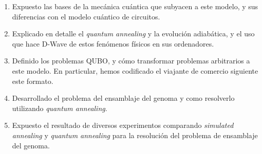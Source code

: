 \documentclass[11pt]{article}
\begin{document}
\begin{enumerate}
	\item Expuesto las bases de la mecánica cuántica que subyacen a este modelo, y sus diferencias con el modelo cuántico de circuitos.
	
	\item Explicado en detalle el \emph{quantum annealing} y la evolución adiabática, y el uso que hace D-Wave de estos fenómenos físicos en sus ordenadores.
	
	\item Definido los problemas QUBO, y cómo transformar problemas arbitrarios a este modelo. En particular, hemos codificado el viajante de comercio siguiente este formato.
	
	\item Desarrollado el problema del ensamblaje del genoma y como resolverlo utilizando \emph{quantum annealing}.
	
	\item Expuesto el resultado de diversos experimentos comparando \emph{simulated annealing} y \emph{quantum annealing} para la resolución del problema de ensamblaje del genoma.
\end{enumerate}
\end{document}
